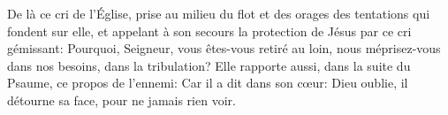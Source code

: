 De là ce cri de l’Église,
	prise au milieu du flot et des orages des tentations qui fondent sur elle,
	et appelant à son secours la protection de Jésus par ce cri gémissant:
	Pourquoi, Seigneur, vous êtes-vous retiré au loin,
	nous méprisez-vous dans nos besoins, dans la tribulation?
Elle rapporte aussi, dans la suite du Psaume, ce propos de l’ennemi:
	Car il a dit dans son cœur:
	Dieu oublie, il détourne sa face, pour ne jamais rien voir.
